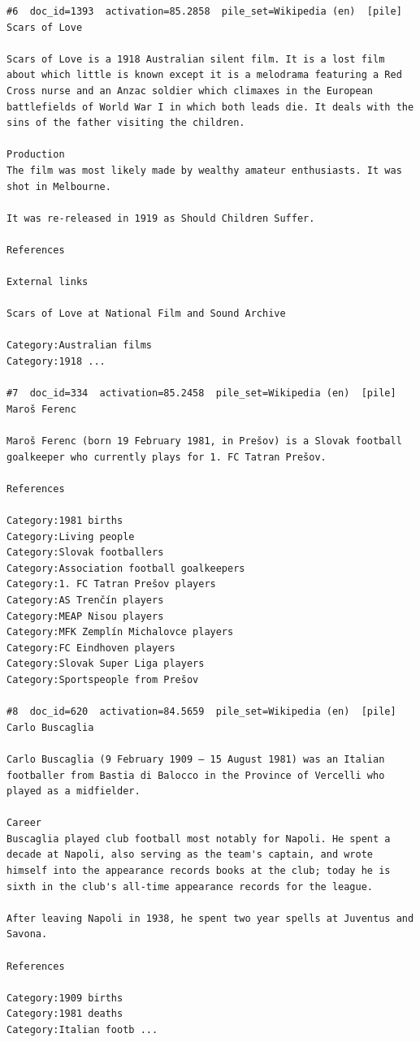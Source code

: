 \begin{verbatim}
#6  doc_id=1393  activation=85.2858  pile_set=Wikipedia (en)  [pile]
Scars of Love

Scars of Love is a 1918 Australian silent film. It is a lost film about which little is known except it is a melodrama featuring a Red Cross nurse and an Anzac soldier which climaxes in the European battlefields of World War I in which both leads die. It deals with the sins of the father visiting the children.

Production
The film was most likely made by wealthy amateur enthusiasts. It was shot in Melbourne.

It was re-released in 1919 as Should Children Suffer.

References

External links

Scars of Love at National Film and Sound Archive

Category:Australian films
Category:1918 ...

#7  doc_id=334  activation=85.2458  pile_set=Wikipedia (en)  [pile]
Maroš Ferenc

Maroš Ferenc (born 19 February 1981, in Prešov) is a Slovak football goalkeeper who currently plays for 1. FC Tatran Prešov.

References

Category:1981 births
Category:Living people
Category:Slovak footballers
Category:Association football goalkeepers
Category:1. FC Tatran Prešov players
Category:AS Trenčín players
Category:MEAP Nisou players
Category:MFK Zemplín Michalovce players
Category:FC Eindhoven players
Category:Slovak Super Liga players
Category:Sportspeople from Prešov

#8  doc_id=620  activation=84.5659  pile_set=Wikipedia (en)  [pile]
Carlo Buscaglia

Carlo Buscaglia (9 February 1909 – 15 August 1981) was an Italian footballer from Bastia di Balocco in the Province of Vercelli who played as a midfielder.

Career
Buscaglia played club football most notably for Napoli. He spent a decade at Napoli, also serving as the team's captain, and wrote himself into the appearance records books at the club; today he is sixth in the club's all-time appearance records for the league.

After leaving Napoli in 1938, he spent two year spells at Juventus and Savona.

References

Category:1909 births
Category:1981 deaths
Category:Italian footb ...


\end{verbatim}
